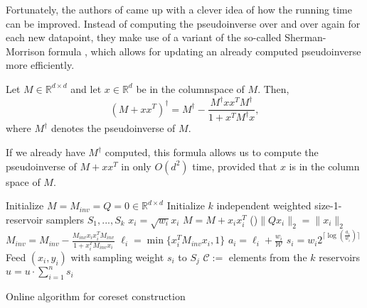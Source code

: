 Fortunately, the authors of \cite{tensor-factorization} came up
with a clever idea of how the running time can be improved.
Instead of computing the pseudoinverse over and over again for
each new datapoint, they make use of a variant of the so-called
Sherman-Morrison formula \cite{sherman-morrison},
which allows for updating an already
computed pseudoinverse more efficiently.

\begin{lemma}
    Let $M \in \mathbb{R}^{d \times d}$ and let $x \in \mathbb{R}^d$
    be in the columnspace of $M$. Then,
    \begin{equation*}
        (M + xx^T)^\dagger = M^\dagger -
        \frac{M^\dagger x x^T M^\dagger}{1 + x^TM^\dagger x},
    \end{equation*}
    where $M^\dagger$ denotes the pseudoinverse of $M$.
\end{lemma}

If we already have $M^\dagger$ computed, this formula allows us
to compute the pseudoinverse of $M + xx^T$ in only $O(d^2)$
time, provided that $x$ is in the column space of $M$.

\begin{algorithm}
    \DontPrintSemicolon
    Initialize $M = M_{inv} = Q = 0 \in \mathbb{R}^{d \times d}$ \;
    Initialize $k$ independent weighted size-1-reservoir
    samplers $S_1, ..., S_k$ \;
     {
    $x_i = \sqrt{w_i} x_i$
    $M = M + x_i x_i^T$
    \If(){$\lVert Q x_i \rVert_2 = \lVert x_i \rVert_2$}{
    $M_{inv} = M_{inv} - \frac{M_{inv}x_ix_i^TM_{inv}}{1 + x_i^T M_{inv} x_i}$
    }
    $\ell_i = \min\{x_i^T M_{inv} x_i, 1\}$
    $a_i = \ell_i + \frac{w_i}{\mathcal{W}}$
    $s_i = w_i 2^{\lceil\log(\frac{a_i}{w_i})\rceil}$
     {
        Feed $(x_i, y_i)$ with sampling weight $s_i$ to $S_j$ \;
    }
    }
    $\mathcal{C} := $ elements from the $k$ reservoirs \;
    $u = u \cdot \sum_{i=1}^n s_i$
    \caption{Online algorithm for coreset construction\label{algo:online}}
\end{algorithm}

